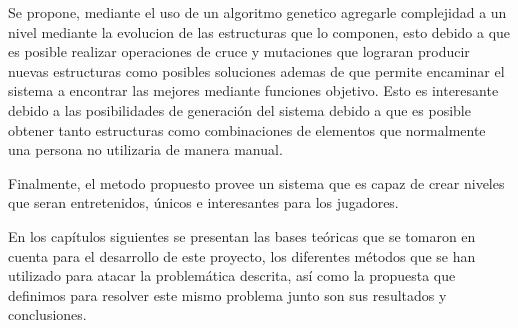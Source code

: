 
Se propone, mediante el uso de un algoritmo genetico agregarle complejidad a un
nivel mediante la evolucion de las estructuras que lo componen, esto debido a
que es posible realizar operaciones de cruce y mutaciones que lograran producir
nuevas estructuras como posibles soluciones ademas de que permite encaminar el
sistema a encontrar las mejores mediante funciones objetivo. Esto es interesante
debido a las posibilidades de generación del sistema debido a que es posible
obtener tanto estructuras como combinaciones de elementos que normalmente una
persona no utilizaria de manera manual.

Finalmente, el metodo propuesto provee un sistema que es capaz de crear niveles
que seran entretenidos, únicos e interesantes para los jugadores.

En los capítulos siguientes se presentan las bases teóricas que se tomaron en
cuenta para el desarrollo de este proyecto, los diferentes métodos que se han
utilizado para atacar la problemática descrita, así como la propuesta que
definimos para resolver este mismo problema junto son sus resultados y
conclusiones.